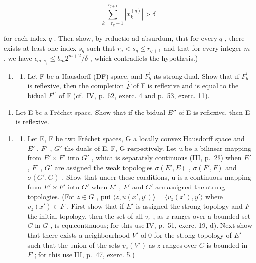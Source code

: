 \[
\sum_ {k = r _ {q} + 1} ^ {r _ {q+1}} \left| x _ {k} ^ {(q)} \right| > \delta
\]

for each index \(q\) . Then show, by reductio ad absurdum, that for every \(q\) , there exists at least one index \(s_q\) such that \(r_q < s_q \leqslant r_{q+1}\) and that for every integer \(m\) , we have \(c_{m,s_q} \leqslant b_m 2^{m+2}/\delta\) , which contradicts the hypothesis.)

\begin{enumerate}
\def\labelenumi{\arabic{enumi})}
\setcounter{enumi}{11}
\tightlist
\item
  \begin{enumerate}
  \def\labelenumii{\alph{enumii})}
  \tightlist
  \item
    Let F be a Hausdorff (DF) space, and \(F_{b}^{\prime}\) its strong dual. Show that if \(F_{b}^{\prime}\) is reflexive, then the completion \(\hat{F}\) of F is reflexive and is equal to the bidual \(F^{\prime\prime}\) of F (cf.~IV, p.~52, exerc. 4 and p.~53, exerc. 11).
  \end{enumerate}
\end{enumerate}

\begin{enumerate}
\def\labelenumi{\alph{enumi})}
\setcounter{enumi}{1}
\tightlist
\item
  Let E be a Fréchet space. Show that if the bidual \(E''\) of E is reflexive, then E is reflexive.
\end{enumerate}

\begin{enumerate}
\def\labelenumi{\arabic{enumi})}
\setcounter{enumi}{12}
\tightlist
\item
  \begin{enumerate}
  \def\labelenumii{\alph{enumii})}
  \tightlist
  \item
    Let E, F be two Fréchet spaces, G a locally convex Hausdorff space and \(E'\) , \(F'\) , \(G'\) the duals of E, F, G respectively. Let u be a bilinear mapping from \(E' \times F'\) into \(G'\) , which is separately continuous (III, p.~28) when \(E'\) , \(F'\) , \(G'\) are assigned the weak topologies \(\sigma(E', E)\) , \(\sigma(F', F)\) and \(\sigma(G', G)\) . Show that under these conditions, u is a continuous mapping from \(E' \times F'\) into \(G'\) when \(E'\) , \(F'\) and \(G'\) are assigned the strong topologies. (For \(z \in G\) , put \(\langle z, u(x', y') \rangle = \langle v_z(x'), y' \rangle\) where \(v_z(x') \in F\) . First show that if \(E'\) is assigned the strong topology and \(F\) the initial topology, then the set of all \(v_z\) , as \(z\) ranges over a bounded set \(C\) in \(G\) , is equicontinuous; for this use IV, p.~51, exerc. 19, d). Next show that there exists a neighbourhood \(V'\) of 0 for the strong topology of \(E'\) such that the union of the sets \(v_z(V')\) as \(z\) ranges over \(C\) is bounded in \(F\) ; for this use III, p.~47, exerc. 5.)
  \end{enumerate}
\end{enumerate}

